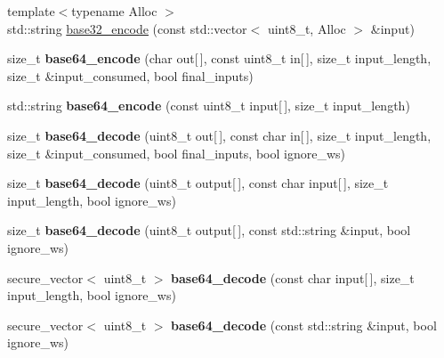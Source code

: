 \begin{DoxyCompactItemize}
\item 
{\footnotesize template$<$typename Alloc $>$ }\\std\+::string \mbox{\hyperlink{namespace_botan_a72149230362af50f830a4ee04d7a9786}{base32\+\_\+encode}} (const std\+::vector$<$ uint8\+\_\+t, Alloc $>$ \&input)
\item 
\mbox{\label{namespace_botan_a6523ad22d65fe36562fd3c6ab12f5b6b}} 
size\+\_\+t {\bfseries base64\+\_\+encode} (char out\mbox{[}$\,$\mbox{]}, const uint8\+\_\+t in\mbox{[}$\,$\mbox{]}, size\+\_\+t input\+\_\+length, size\+\_\+t \&input\+\_\+consumed, bool final\+\_\+inputs)
\item 
\mbox{\label{namespace_botan_a043fc1f11e0639e191f3735355b76c08}} 
std\+::string {\bfseries base64\+\_\+encode} (const uint8\+\_\+t input\mbox{[}$\,$\mbox{]}, size\+\_\+t input\+\_\+length)
\item 
\mbox{\label{namespace_botan_a840616cbb8c9fffedde8508a10f06e9f}} 
size\+\_\+t {\bfseries base64\+\_\+decode} (uint8\+\_\+t out\mbox{[}$\,$\mbox{]}, const char in\mbox{[}$\,$\mbox{]}, size\+\_\+t input\+\_\+length, size\+\_\+t \&input\+\_\+consumed, bool final\+\_\+inputs, bool ignore\+\_\+ws)
\item 
\mbox{\label{namespace_botan_a44fbd9eed5cd70c5ac34015f9c6578a1}} 
size\+\_\+t {\bfseries base64\+\_\+decode} (uint8\+\_\+t output\mbox{[}$\,$\mbox{]}, const char input\mbox{[}$\,$\mbox{]}, size\+\_\+t input\+\_\+length, bool ignore\+\_\+ws)
\item 
\mbox{\label{namespace_botan_a74b5a2020a00373f789d3c81dccba41b}} 
size\+\_\+t {\bfseries base64\+\_\+decode} (uint8\+\_\+t output\mbox{[}$\,$\mbox{]}, const std\+::string \&input, bool ignore\+\_\+ws)
\item 
\mbox{\label{namespace_botan_adbcc604809015edf46a9e5d1a6118754}} 
secure\+\_\+vector$<$ uint8\+\_\+t $>$ {\bfseries base64\+\_\+decode} (const char input\mbox{[}$\,$\mbox{]}, size\+\_\+t input\+\_\+length, bool ignore\+\_\+ws)
\item 
\mbox{\label{namespace_botan_ad3e42438968d9eb2c77cb6c84f2e6480}} 
secure\+\_\+vector$<$ uint8\+\_\+t $>$ {\bfseries base64\+\_\+decode} (const std\+::string \&input, bool ignore\+\_\+ws)

\end{DoxyCompactItemize}
